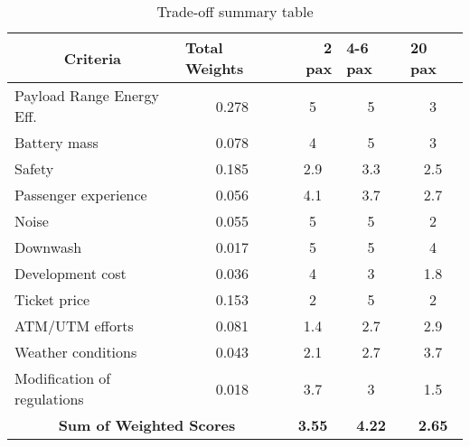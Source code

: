 \begin{table}[h]
\centering
\captionsetup{justification=centering}
\caption{Trade-off summary table}
\label{TO-summary}
\begin{tabular}{lcccc}
\hline
\multicolumn{1}{c}{\textbf{Criteria}} & \multicolumn{1}{l}{\textbf{Total Weights}} & \multicolumn{1}{r}{\textbf{2 pax}} & \multicolumn{1}{l}{\textbf{4-6 pax}} & \multicolumn{1}{l}{\textbf{20 pax}} \\ \hline
Payload Range Energy Eff. & 0.278 & \cellcolor[HTML]{E6FFE5}5 & \cellcolor[HTML]{E6FFE5}5 & 3 \\
Battery mass & 0.078 & 4 & \cellcolor[HTML]{E6FFE5}5 & 3 \\
Safety & 0.185 & 2.9 & \cellcolor[HTML]{E6FFE5}3.3 & 2.5 \\
Passenger experience & 0.056 & \cellcolor[HTML]{E6FFE5}4.1 & 3.7 & 2.7 \\
Noise & 0.055 & \cellcolor[HTML]{E6FFE5}5 & \cellcolor[HTML]{E6FFE5}5 & 2 \\
Downwash & 0.017 & \cellcolor[HTML]{E6FFE5}5 & \cellcolor[HTML]{E6FFE5}5 & 4 \\
Development cost & 0.036 & \cellcolor[HTML]{E6FFE5}4 & 3 & 1.8 \\
Ticket price & 0.153 & 2 & \cellcolor[HTML]{E6FFE5}5 & 2 \\
ATM/UTM efforts & 0.081 & 1.4 & 2.7 & \cellcolor[HTML]{E6FFE5}2.9 \\
Weather conditions & 0.043 & 2.1 & 2.7 & \cellcolor[HTML]{E6FFE5}3.7 \\
Modification of regulations & 0.018 & \cellcolor[HTML]{E6FFE5}3.7 & 3 & 1.5 \\ \hline
\multicolumn{2}{c}{\textbf{Sum of Weighted Scores}} & \cellcolor[HTML]{FFFC9E}\textbf{3.55} & \cellcolor[HTML]{67FD9A}\textbf{4.22} & \cellcolor[HTML]{FD6864}\textbf{2.65} \\ \hline
\end{tabular}
\end{table}


